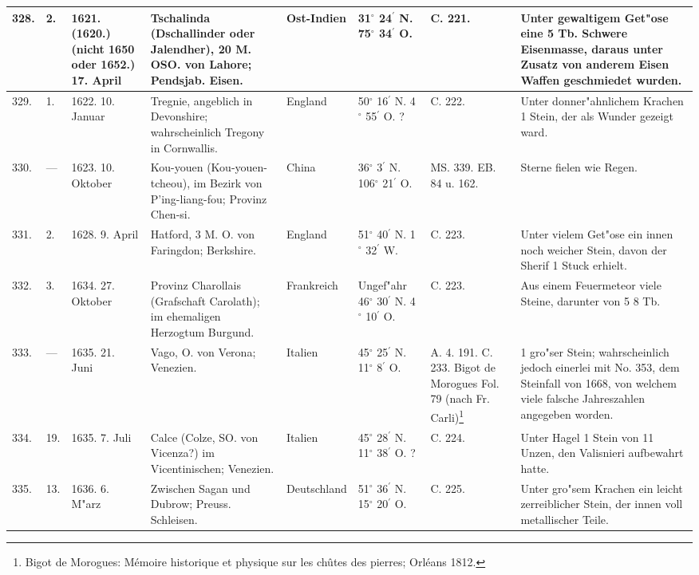 \documentclass[a4paper, 8pt, oneside, polutonikogreek, german]{article}
\begin{document}
\begin{center}
\begin{longtable}{| p{5mm} | p{3mm} | p{15mm} | p{25mm} | p{20mm} | p{14mm} | p{17mm} | p{24mm} |}
        328. & 2. & 1621. (1620.) (nicht 1650 oder 1652.) 17. April & Tschalinda (Dschallinder oder Jalendher), 20 M. OSO. von Lahore; Pendsjab. Eisen. & Ost-Indien & 31$^\circ$ 24$^\prime$ N. 75$^\circ$ 34$^\prime$ O. & C. 221. & Unter gewaltigem Get"ose eine 5 Tb. Schwere Eisenmasse, daraus unter Zusatz von anderem Eisen Waffen geschmiedet wurden. \\ \hline
        329. & 1. & 1622. 10. Januar & Tregnie, angeblich in Devonshire; wahrscheinlich Tregony in Cornwallis. & England & 50$^\circ$ 16$^\prime$ N. 4$^\circ$ 55$^\prime$ O. ? & C. 222. & Unter donner"ahnlichem Krachen 1 Stein, der als Wunder gezeigt ward. \\ \hline
        330. & --- & 1623. 10. Oktober & Kou-youen (Kou-youen-tcheou), im Bezirk von P’ing-liang-fou; Provinz Chen-si. & China & 36$^\circ$ 3$^\prime$ N. 106$^\circ$ 21$^\prime$ O. & MS. 339. EB. 84 u. 162. & Sterne fielen wie Regen. \\ \hline
        331. & 2. & 1628. 9. April & Hatford, 3 M. O. von Faringdon; Berkshire. & England & 51$^\circ$ 40$^\prime$ N. 1$^\circ$ 32$^\prime$ W. & C. 223. & Unter vielem Get"ose ein innen noch weicher Stein, davon der Sherif 1 Stuck erhielt. \\ \hline
        332. & 3. & 1634. 27. Oktober & Provinz Charollais (Grafschaft Carolath); im ehemaligen Herzogtum Burgund. & Frankreich & Ungef"ahr 46$^\circ$ 30$^\prime$ N. 4$^\circ$ 10$^\prime$ O. & C. 223. & Aus einem Feuermeteor viele Steine, darunter von 5 8 Tb. \\ \hline
        333. & --- & 1635. 21. Juni & Vago, O. von Verona; Venezien. & Italien & 45$^\circ$ 25$^\prime$ N. 11$^\circ$ 8$^\prime$ O. & A. 4. 191. C. 233. Bigot de Morogues Fol. 79 (nach Fr. Carli)\footnote{Bigot de Morogues: Mémoire historique et physique sur les chûtes des pierres; Orléans 1812.} & 1 gro"ser Stein; wahrscheinlich jedoch einerlei mit No. 353, dem Steinfall von 1668, von welchem viele falsche Jahreszahlen angegeben worden. \\ \hline
        334. & 19. & 1635. 7. Juli & Calce (Colze, SO. von Vicenza?) im Vicentinischen; Venezien. & Italien & 45$^\circ$ 28$^\prime$ N. 11$^\circ$ 38$^\prime$ O. ? & C. 224. & Unter Hagel 1 Stein von 11 Unzen, den Valisnieri aufbewahrt hatte. \\ \hline
        335. & 13. & 1636. 6. M"arz & Zwischen Sagan und Dubrow; Preuss. Schleisen. & Deutschland & 51$^\circ$ 36$^\prime$ N. 15$^\circ$ 20$^\prime$ O. & C. 225. & Unter gro"sem Krachen ein leicht zerreiblicher Stein, der innen voll metallischer Teile. \\ \hline

\end{longtable}
\end{center}
\end{document}
